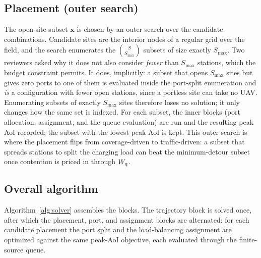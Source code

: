 \subsection{Placement (outer search)}
\label{subsec:place_block}
The open-site subset $\mathbf{x}$ is chosen by an outer search over the candidate
combinations. Candidate sites are the interior nodes of a regular grid over the
field, and the search enumerates the $\binom{S}{S_{\max}}$ subsets of size exactly $S_{\max}$.
Two reviewers asked why it does not also consider \emph{fewer} than $S_{\max}$
stations, which the budget constraint permits. It does, implicitly: a subset that
opens $S_{\max}$ sites but gives zero ports to one of them is evaluated inside the
port-split enumeration and \emph{is} a configuration with fewer open stations, since a
portless site can take no UAV. Enumerating subsets of exactly $S_{\max}$ sites
therefore loses no solution; it only changes how the same set is indexed. For each
subset, the inner blocks (port allocation, assignment, and
the queue evaluation) are run and the resulting peak AoI recorded; the subset
with the lowest peak AoI is kept. This outer search is where the placement flips
from coverage-driven to traffic-driven: a subset that spreads stations to split
the charging load can beat the minimum-detour subset once contention is priced
in through $W_{\mathrm q}$.

\subsection{Overall algorithm}
\label{subsec:algorithm}
Algorithm~\ref{alg:solver} assembles the blocks. The trajectory block is solved
once, after which the placement, port, and assignment blocks are alternated: for
each candidate placement the port split and the load-balancing assignment are
optimized against the same peak-AoI objective, each evaluated through the
finite-source queue.

